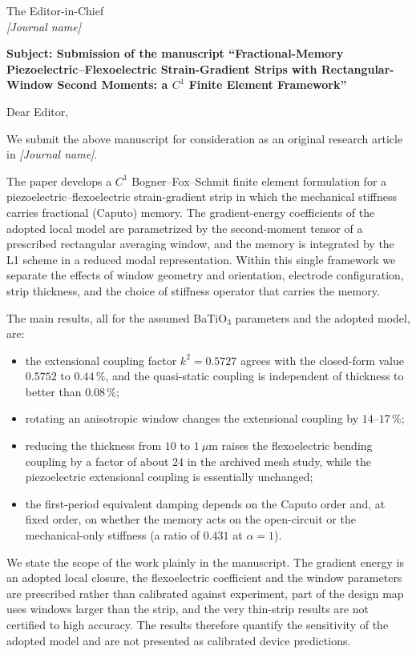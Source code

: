 \documentclass[10.5pt,a4paper]{article}
\begin{document}
\pagestyle{empty}

\begin{flushright}
[Date]
\end{flushright}

The Editor-in-Chief\\
\textit{[Journal name]}

\medskip
\textbf{Subject: Submission of the manuscript ``Fractional-Memory Piezoelectric--Flexoelectric Strain-Gradient Strips with Rectangular-Window Second Moments: a $C^{1}$ Finite Element Framework''}

\medskip
Dear Editor,

We submit the above manuscript for consideration as an original research article in \textit{[Journal name]}.

The paper develops a $C^{1}$ Bogner--Fox--Schmit finite element formulation for a piezoelectric--flexoelectric strain-gradient strip in which the mechanical stiffness carries fractional (Caputo) memory. The gradient-energy coefficients of the adopted local model are parametrized by the second-moment tensor of a prescribed rectangular averaging window, and the memory is integrated by the L1 scheme in a reduced modal representation. Within this single framework we separate the effects of window geometry and orientation, electrode configuration, strip thickness, and the choice of stiffness operator that carries the memory.

The main results, all for the assumed BaTiO$_3$ parameters and the adopted model, are:
\begin{itemize}
\item the extensional coupling factor $k^{2}=0.5727$ agrees with the closed-form value $0.5752$ to $0.44\,\%$, and the quasi-static coupling is independent of thickness to better than $0.08\,\%$;
\item rotating an anisotropic window changes the extensional coupling by $14$--$17\,\%$;
\item reducing the thickness from $10$ to $1~\mu$m raises the flexoelectric bending coupling by a factor of about $24$ in the archived mesh study, while the piezoelectric extensional coupling is essentially unchanged;
\item the first-period equivalent damping depends on the Caputo order and, at fixed order, on whether the memory acts on the open-circuit or the mechanical-only stiffness (a ratio of $0.431$ at $\alpha=1$).
\end{itemize}

We state the scope of the work plainly in the manuscript. The gradient energy is an adopted local closure, the flexoelectric coefficient and the window parameters are prescribed rather than calibrated against experiment, part of the design map uses windows larger than the strip, and the very thin-strip results are not certified to high accuracy. The results therefore quantify the sensitivity of the adopted model and are not presented as calibrated device predictions.
\end{document}
